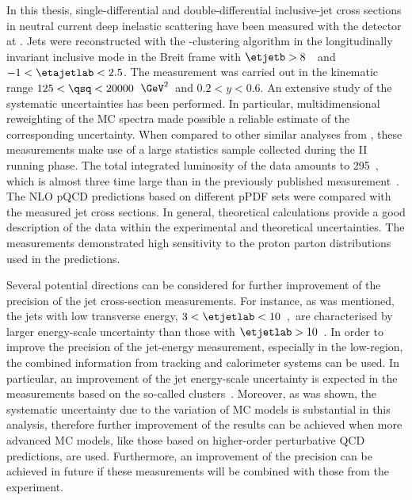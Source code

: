 In this thesis, single-differential and double-differential inclusive-jet cross sections in neutral current deep inelastic scattering have been measured with the \zeus detector at \hera. Jets were reconstructed with the \kt-clustering algorithm in the longitudinally invariant inclusive mode in the Breit frame with $\etjetb > 8$~\GeV~and $-1<\etajetlab<2.5$. The measurement was carried out in the kinematic range $125 < \qsq < 20000$~$\GeV^2$~and $0.2<y<0.6$. An extensive study of the systematic uncertainties has been performed. In particular, multidimensional re\-weight\-ing of the MC spectra made possible a reliable estimate of the corresponding uncertainty. When compared to other similar analyses from \zeus, these measurements make use of a large statistics sample collected during the \hera II running phase. The total integrated luminosity of the data amounts to 295~\invpb, which is almost three time large than in the previously published measurement~\cite{Abramowicz:2010ke}. The NLO pQCD predictions based on different pPDF sets were compared with the measured jet cross sections. In general, theoretical calculations provide a good description of the data within the experimental and theoretical uncertainties. The measurements demonstrated high sensitivity to the proton parton distributions used in the predictions.

Several potential directions can be considered for further improvement of the precision of the jet cross-section measurements. For instance, as was mentioned, the jets with low transverse energy, $3 < \etjetlab < 10$~\GeV,~are characterised by larger energy-scale uncertainty than those with $\etjetlab > 10$~\GeV. In order to improve the precision of the jet-energy measurement, especially in the low-\etjetlab region, the combined information from tracking and calorimeter systems can be used. In particular, an improvement of the jet energy-scale uncertainty is expected in the measurements based on the so-called \zufos clusters~\cite{upub:Tuning:zn01021}. Moreover, as was shown, the systematic uncertainty due to the variation of MC models is substantial in this analysis, therefore further improvement of the results can be achieved when more advanced MC models, like those based on higher-order perturbative QCD predictions, are used. Furthermore, an improvement of the precision can be achieved in future if these measurements will be combined with those from the \hone experiment.

